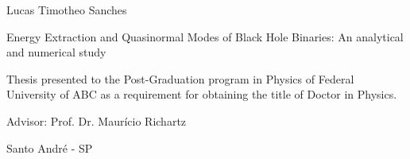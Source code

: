 \documentclass[12pt, twoside]{report}
\begin{document}

\begin{center}
  Lucas Timotheo Sanches
  \par\end{center}

\vspace{2.5cm}


\begin{center}
  {\huge{}Energy Extraction and Quasinormal Modes of Black Hole Binaries: An analytical and numerical study}{\huge\par}
  \par\end{center}

\begin{center}
  \vspace{2.5cm}
  \par\end{center}


\begin{center}
  \begin{minipage}[t]{0.6\columnwidth}
    \begin{center}
      Thesis presented to the Post-Graduation program in Physics of
      Federal University of ABC as a requirement for obtaining the title
      of Doctor in Physics.
      \par\end{center}
  \end{minipage}
  \par\end{center}


\begin{center}
  \vspace{2cm}
  Advisor: Prof. Dr. Maurício Richartz
  \par\end{center}


\begin{center}
  \vspace{2cm}
  Santo André - SP
  \par\end{center}
\end{document}
